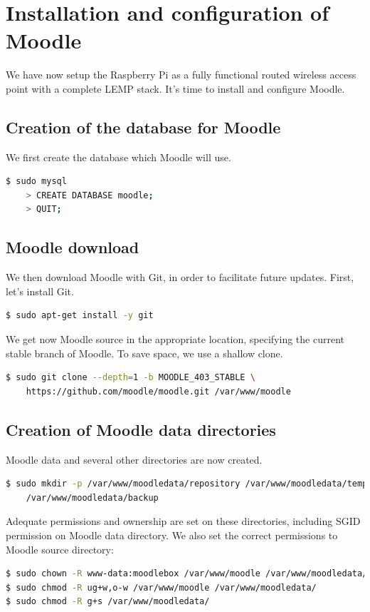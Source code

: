 \documentclass[12pt]{article}
\begin{document}
\section{Installation and configuration of Moodle}

We have now setup the Raspberry Pi as a fully functional routed wireless access point with a complete LEMP stack.
It's time to install and configure Moodle.

\subsection{Creation of the database for Moodle}

We first create the database which Moodle will use.
\begin{lstlisting}[language=bash]
$ sudo mysql
    > CREATE DATABASE moodle;
    > QUIT;
\end{lstlisting}

\subsection{Moodle download}

We then download Moodle with Git, in order to facilitate future updates.
First, let's install Git.
\begin{lstlisting}[language=bash]
$ sudo apt-get install -y git
\end{lstlisting}

We get now Moodle source in the appropriate location, specifying the current stable branch of Moodle.
To save space, we use a shallow clone.
\begin{lstlisting}[language=bash]
$ sudo git clone --depth=1 -b MOODLE_403_STABLE \
    https://github.com/moodle/moodle.git /var/www/moodle
\end{lstlisting}

\subsection{Creation of Moodle data directories}

Moodle data and several other directories are now created.
\begin{lstlisting}[language=bash]
$ sudo mkdir -p /var/www/moodledata/repository /var/www/moodledata/temp \
    /var/www/moodledata/backup
\end{lstlisting}
Adequate permissions and ownership are set on these directories, including SGID permission on Moodle data directory.
We also set the correct permissions to Moodle source directory:
\begin{lstlisting}[language=bash]
$ sudo chown -R www-data:moodlebox /var/www/moodle /var/www/moodledata/
$ sudo chmod -R ug+w,o-w /var/www/moodle /var/www/moodledata/
$ sudo chmod -R g+s /var/www/moodledata/
\end{lstlisting}
\end{document}
